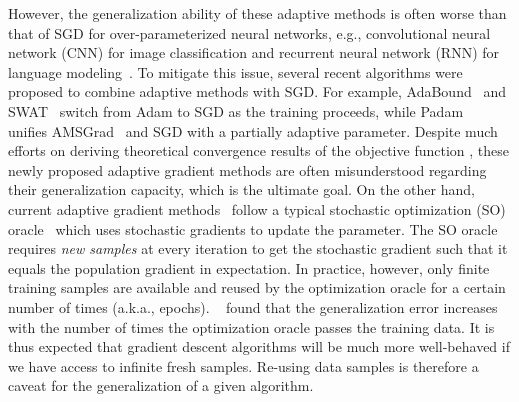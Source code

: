 \documentclass[11pt]{article}
\begin{document}
However, the generalization ability of these adaptive methods is often worse than that of SGD for over-parameterized neural networks, e.g., convolutional neural network (CNN) for image classification and recurrent neural network (RNN) for language modeling~\citep{wiro17}. 
To mitigate this issue, several recent algorithms were proposed to combine adaptive methods with SGD.
For example, AdaBound~\citep{luxi2019} and SWAT~\citep{keso2017} switch from Adam to SGD as the training proceeds, while Padam~\citep{chgu2018, zhta18} unifies AMSGrad~\citep{reka2018} and SGD with a partially adaptive parameter.  
Despite much efforts on deriving theoretical convergence results of the objective function \citep{zare18,wawu19, zosh2019, cheli2019}, these newly proposed adaptive gradient methods are often misunderstood regarding their generalization capacity, which is the ultimate goal.
On the other hand, current adaptive gradient methods~\citep{duha11,kiba15,tige12, reka2018, wawu19} follow a typical stochastic optimization (SO) oracle~\citep{romo51, ghla2013} which uses stochastic gradients to update the parameter. The SO oracle requires \emph{new samples} at every iteration to get the stochastic gradient such that it equals the population gradient in expectation. In practice, however, only finite training samples are available and reused by the optimization oracle for a certain number of times (a.k.a., epochs). 
~\citet{hare2016} found that the generalization error increases with the number of times the optimization oracle passes the training data. 
It is thus expected that gradient descent algorithms will be much more well-behaved if we have access to infinite fresh samples. 
Re-using data samples is therefore a caveat for the generalization of a given algorithm.
\end{document}
